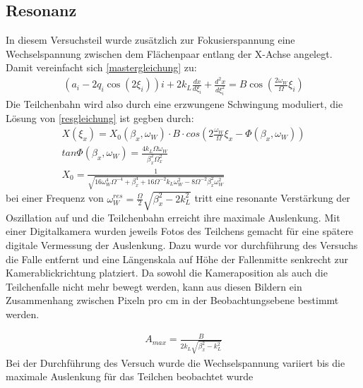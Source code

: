 \documentclass[a4paper,12pt]{article}
\begin{document}
\subsection{Resonanz}
In diesem Versuchsteil wurde zusätzlich zur Fokusierspannung  eine Wechselspannung zwischen dem Flächenpaar entlang der X-Achse angelegt. Damit vereinfacht sich \ref{mastergleichung} zu: 
\begin{align*}\label{resgleichung}
	\left( a_i -2q_i \cos\left( 2\xi_i \right) \right) i  + 2k_L \frac{dx}{d\xi_i} + \frac{d^2x}{d\xi_i^2} = B\cos\left( \frac{2ω_W}{Ω}ξ_i \right)
\end{align*}
Die Teilchenbahn wird also durch eine erzwungene Schwingung moduliert, die Lösung von \ref{resgleichung} ist gegben durch:
\begin{align*}\label{resgleichung}
	X(\xi_x) = X_0( \beta_x,\omega_W ) \cdot B \cdot cos(2\frac{\omega_W}{\Omega}\xi_x - \Phi(\beta_x,\omega_W))
	\\
	 tan\Phi(\beta_x,\omega_W) = \frac{4 k_L \Omega \omega_W}{\beta_x^{2}\Omega_x^{2}} 
	 \\
	  X_0 = \frac{1}{\sqrt{16\omega^{4}_W\Omega^{-4}+\beta^{4}_x+16\Omega^{-2}k_L\omega^{2}_W-8\Omega^{-2}\beta^{2}_x\omega^{2}_W}}
\end{align*}
bei einer Frequenz von $\omega^{res}_W = \frac{\Omega}{2}\sqrt{\beta^{2}_x-2k^{2}_L} $ tritt eine resonante 
Verstärkung der Oszillation auf und die Teilchenbahn erreicht ihre maximale Auslenkung.
Mit einer Digitalkamera wurden jeweils Fotos des Teilchens gemacht für eine spätere digitale Vermessung der Auslenkung.
Dazu wurde vor durchführung des Versuchs die Falle entfernt und eine Längenskala auf Höhe der Fallenmitte senkrecht zur Kamerablickrichtung platziert.  
Da sowohl die Kameraposition als auch die Teilchenfalle nicht mehr bewegt werden, kann aus diesen Bildern ein Zusammenhang zwischen Pixeln pro cm in der Beobachtungsebene 
bestimmt werden.


\begin{align*}\label{Amax}
	A_{max} = \frac{B}{2k_L\sqrt{\beta^{2}_x-k^{2}_L}}
\end{align*}
Bei der Durchführung des Versuch wurde die Wechselspannung variiert bis die maximale Auslenkung für das Teilchen beobachtet wurde 
\end{document}
